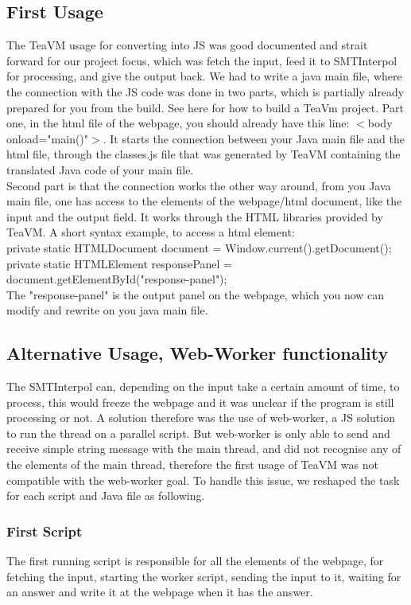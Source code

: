 \documentclass[]{article}
\begin{document}
\subsection{First Usage}

The TeaVM usage for converting into JS was good documented and strait forward for our project focus, which was fetch the input, feed it to SMTInterpol for processing, and give the output back. We had to write a java main file, where the connection with the JS code was done in two parts, which is partially already prepared for you from the build. See here\cite{2} for how to build a TeaVm project.
Part one, in the html file of the webpage, you should already have this line: $<$body onload="main()"$>$. It starts the connection between your Java main file and the html file, through the classes.js file that was generated by TeaVM containing the translated Java code of your main file.\\
Second part is that the connection works the other way around, from you Java main file, one has access to the elements of the webpage/html document, like the input and the output field. It works through the HTML libraries provided by TeaVM. A short syntax example, to access a html element:  \\
private static HTMLDocument document = Window.current().getDocument(); \\
private static HTMLElement responsePanel = document.getElementById("response-panel"); \\ The "response-panel" is the output panel on the webpage, which you now can modify and rewrite on you java main file. 

\subsection{Alternative Usage, Web-Worker functionality}

The SMTInterpol can, depending on the input take a certain amount of time, to process, this would freeze the webpage and it was unclear if the program is still processing or not. A solution therefore was the use of web-worker, a JS solution to run the thread on a parallel script. But web-worker is only able to send and receive simple string message with the main thread, and did not recognise any of the elements of the main thread, therefore the first usage of TeaVM was not compatible with the web-worker goal. To handle this issue, we reshaped the task for each script and Java file as following.
\subsubsection{First Script}
The first running script is responsible for all the elements of the webpage, for fetching the input, starting the worker script, sending the input to it, waiting for an answer and write it at the webpage when it has the answer.
\end{document}
